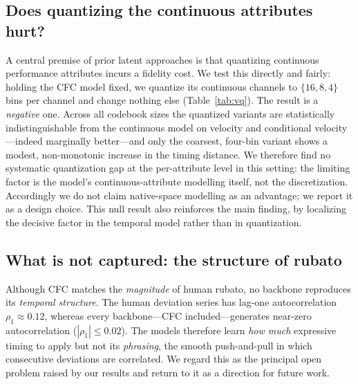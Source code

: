 \documentclass[review]{elsarticle}
\begin{document}
\subsection{Does quantizing the continuous attributes hurt?}
\label{sec:vq}
A central premise of prior latent approaches is that quantizing continuous performance
attributes incurs a fidelity cost. We test this directly and fairly: holding the CFC model
fixed, we quantize its continuous channels to $\{16,8,4\}$ bins per channel and change
nothing else (Table~\ref{tab:vq}). The result is a \emph{negative} one. Across all codebook
sizes the quantized variants are statistically indistinguishable from the continuous model
on velocity and conditional velocity---indeed marginally better---and only the coarsest,
four-bin variant shows a modest, non-monotonic increase in the timing distance. We therefore
find no systematic quantization gap at the per-attribute level in this setting: the limiting
factor is the model's continuous-attribute modelling itself, not the discretization.
Accordingly we do not claim native-space modelling as an advantage; we report it as a
design choice. This null result also reinforces the main finding, by localizing the decisive
factor in the temporal model rather than in quantization.

\begin{table}[t]
\centering
\caption{Effect of quantizing the continuous attributes of the CFC model to $b$ bins per
channel (mean over three seeds). No systematic gap emerges across codebook sizes; lower is
better.}
\label{tab:vq}
\end{table}

\subsection{What is not captured: the structure of rubato}
\label{sec:limitation}
Although CFC matches the \emph{magnitude} of human rubato, no backbone reproduces its
\emph{temporal structure}. The human deviation series has lag-one autocorrelation
$\rho_1\approx0.12$, whereas every backbone---CFC included---generates near-zero
autocorrelation ($|\rho_1|\le0.02$). The models therefore learn \emph{how much} expressive
timing to apply but not its \emph{phrasing}, the smooth push-and-pull in which consecutive
deviations are correlated. We regard this as the principal open problem raised by our
results and return to it as a direction for future work.
\end{document}
